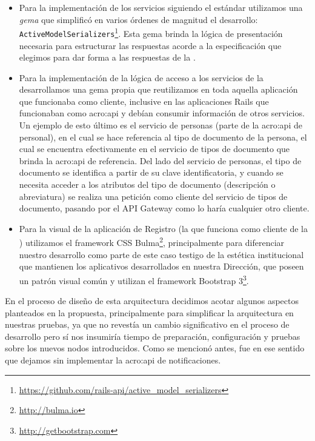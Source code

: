 \begin{itemize}
  \item Para la implementación de los servicios siguiendo el estándar  utilizamos una \textit{gema} que simplificó en varios órdenes de magnitud el desarrollo: \texttt{ActiveModelSerializers}\footnote{\url{https://github.com/rails-api/active_model_serializers}}. Esta gema brinda la lógica de presentación necesaria para estructurar las respuestas acorde a la especificación  que elegimos para dar forma a las respuestas de la {\cloud}.

  \item Para la implementación de la lógica de acceso a los servicios de la {\cloud} desarrollamos una gema propia que reutilizamos en toda aquella aplicación que funcionaba como cliente, inclusive en las aplicaciones Rails que funcionaban como \gls{acro:api} y debían consumir información de otros servicios. Un ejemplo de esto último es el servicio de personas (parte de la \gls{acro:api} de personal), en el cual se hace referencia al tipo de documento de la persona, el cual se encuentra efectivamente en el servicio de tipos de documento que brinda la \gls{acro:api} de referencia. Del lado del servicio de personas, el tipo de documento se identifica a partir de su clave identificatoria, y cuando se necesita acceder a los atributos del tipo de documento (descripción o abreviatura) se realiza una petición como cliente del servicio de tipos de documento, pasando por el API Gateway como lo haría cualquier otro cliente.

  \item Para la visual de la aplicación de Registro (la que funciona como cliente de la {\cloud}) utilizamos el framework CSS Bulma\footnote{\url{http://bulma.io}}, principalmente para diferenciar nuestro desarrollo como parte de este caso testigo de la estética institucional que mantienen los aplicativos desarrollados en nuestra Dirección, que poseen un patrón visual común y utilizan el framework Bootstrap 3\footnote{\url{http://getbootstrap.com}}.
\end{itemize}

En el proceso de diseño de esta arquitectura decidimos acotar algunos aspectos planteados en la propuesta, principalmente para simplificar la arquitectura en nuestras pruebas, ya que no revestía un cambio significativo en el proceso de desarrollo pero sí nos insumiría tiempo de preparación, configuración y pruebas sobre los nuevos nodos introducidos. Como se mencionó antes, fue en ese sentido que dejamos sin implementar la \gls{acro:api} de notificaciones.

